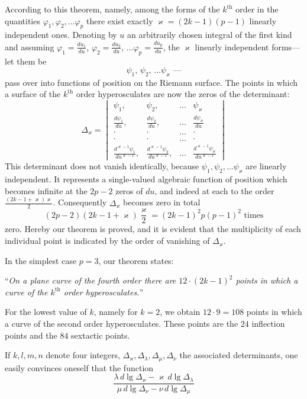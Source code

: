 \documentclass{article}
\begin{document}
According to this theorem, namely, among the forms of the $k^{\text{th}}$ order in the quantities $\varphi_1, \varphi_2, \dots \varphi_p$ there exist exactly $\varkappa = (2k-1)(p-1)$ linearly independent ones. Denoting by $u$ an arbitrarily chosen integral of the first kind and assuming $\varphi_1 = \frac{du_1}{du}$, $\varphi_2 = \frac{du_2}{du}$, $\dots \varphi_p = \frac{du_p}{du}$, the $\varkappa$ linearly independent forms—let them be
\[
\psi_1,\, \psi_2,\, \dots \psi_\varkappa \text{ ---}
\]
pass over into functions of position on the Riemann surface. The points in which a surface of the $k^{\text{th}}$ order hyperosculates are now the zeros of the determinant:
\[
\Delta_\varkappa =
\begin{vmatrix}
\psi_1, & \psi_2, & \dots & \psi_\varkappa \\
\frac{d\psi_1}{du}, & \frac{d\psi_2}{du}, & \dots & \frac{d\psi_\varkappa}{du} \\
\cdot & \cdot & \dots & \cdot \\
\cdot & \cdot & \dots & \cdot \\
\frac{d^{\varkappa-1}\psi_1}{du^{\varkappa-1}}, & \frac{d^{\varkappa-1}\psi_2}{du^{\varkappa-1}}, & \dots & \frac{d^{\varkappa-1}\psi_\varkappa}{du^{\varkappa-1}}
\end{vmatrix}
\]
This determinant does not vanish identically, because $\psi_1, \psi_2, \dots \psi_\varkappa$ are linearly independent. It represents a single-valued algebraic function of position which becomes infinite at the $2p - 2$ zeros of $du$, and indeed at each to the order $\frac{(2k-1+\varkappa)\varkappa}{2}$. Consequently $\Delta_\varkappa$ becomes zero in total
\[
(2p-2)(2k-1+\varkappa)\frac{\varkappa}{2} = (2k-1)^2 p(p-1)^2\text{ times}
\]
zero. Hereby our theorem is proved, and it is evident that the multiplicity of each individual point is indicated by the order of vanishing of $\Delta_\varkappa$.

In the simplest case $p = 3$, our theorem states:

``\emph{On a plane curve of the fourth order there are $12 \cdot (2k-1)^2$ points in which a curve of the $k^{\text{th}}$ order hyperosculates.}''

For the lowest value of $k$, namely for $k = 2$, we obtain $12 \cdot 9 = 108$ points in which a curve of the second order hyperosculates. These points are the $24$ inflection points and the $84$ sextactic points.

If $k, l, m, n$ denote four integers, $\Delta_\varkappa, \Delta_\lambda, \Delta_\mu, \Delta_\nu$ the associated determinants, one easily convinces oneself that the function
\[
\frac{\lambda \, d\lg\Delta_\varkappa - \varkappa \, d\lg\Delta_\lambda}{\mu \, d\lg\Delta_\nu - \nu \, d\lg\Delta_\mu}
\]
\end{document}
